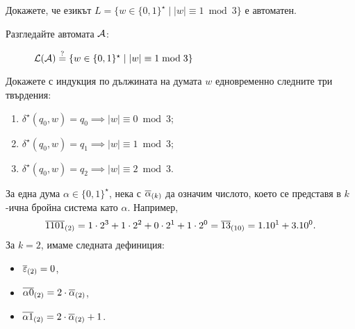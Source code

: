 \begin{problem}
  Докажете, че езикът $L = \{w \in \{0,1\}^\star \mid |w| \equiv 1 \bmod 3\}$ е автоматен.
\end{problem}
\begin{hint}
  Разгледайте автомата $\mathcal{A}$:
  \begin{framed}
    \begin{figure}[H]
      \begin{center}
      \end{center}
      \caption{$\mathcal{L}(\mathcal{A}) \stackrel{?}{=} \{w\in\{0,1\}^\star \mid |w| \equiv 1 \bmod 3\}$}
    \end{figure}  
  \end{framed}
 Докажете с индукция по дължината на думата $w$ едновременно следните три твърдения:
 \begin{enumerate}[(1)]
 \item
   $\delta^\star(q_0, w) = q_0 \implies |w| \equiv 0 \bmod 3$;
 \item 
   $\delta^\star(q_0, w) = q_1 \implies |w| \equiv 1 \bmod 3$;
 \item
   $\delta^\star(q_0, w) = q_2 \implies |w| \equiv 2 \bmod 3$.
 \end{enumerate}
\end{hint}

За една дума $\alpha \in \{0,1\}^\star$, 
нека с $\overline{\alpha}_{(k)}$ да означим числото, което се представя в $k$-ична бройна система като $\alpha$.
Например, 
\[\overline{1101}_{(2)} = 1 \cdot 2^3+1\cdot 2^2+0\cdot 2^1+1\cdot 2^0 = \overline{13}_{(10)} = 1.10^1 + 3.10^0.\]
За $k = 2$, имаме следната дефиниция:
\begin{itemize}
\item
  $\overline{\varepsilon}_{(2)} = 0$,
\item
  $\overline{\alpha 0}_{(2)} = 2\cdot \overline{\alpha}_{(2)}$,
\item
  $\overline{\alpha 1}_{(2)} = 2\cdot \overline{\alpha}_{(2)} + 1$.
\end{itemize}

